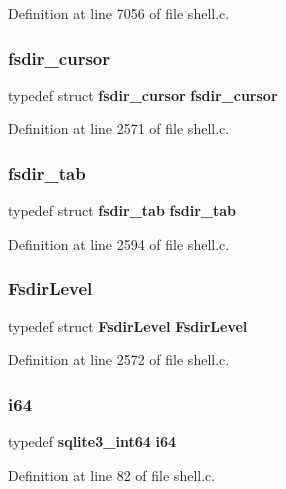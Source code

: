 Definition at line 7056 of file shell.\+c.

\mbox{\label{shell_8c_a5b7584a07747418e506a52041076f21b}} 
\subsubsection{fsdir\+\_\+cursor}
{\footnotesize\ttfamily typedef struct \textbf{ fsdir\+\_\+cursor} \textbf{ fsdir\+\_\+cursor}}



Definition at line 2571 of file shell.\+c.

\mbox{\label{shell_8c_a2fd39177aea93f3800c460847a5d7ba7}} 
\subsubsection{fsdir\+\_\+tab}
{\footnotesize\ttfamily typedef struct \textbf{ fsdir\+\_\+tab} \textbf{ fsdir\+\_\+tab}}



Definition at line 2594 of file shell.\+c.

\mbox{\label{shell_8c_ade1e4ddce17bd39a54b7aca067602c54}} 
\subsubsection{Fsdir\+Level}
{\footnotesize\ttfamily typedef struct \textbf{ Fsdir\+Level} \textbf{ Fsdir\+Level}}



Definition at line 2572 of file shell.\+c.

\mbox{\label{shell_8c_a9b2c7298acf62c3803b0fbded620026a}} 
\subsubsection{i64}
{\footnotesize\ttfamily typedef \textbf{ sqlite3\+\_\+int64} \textbf{ i64}}



Definition at line 82 of file shell.\+c.

\mbox{\label{shell_8c_a6d7ab9c44863fb26e8abdf85bffdab94}} 
